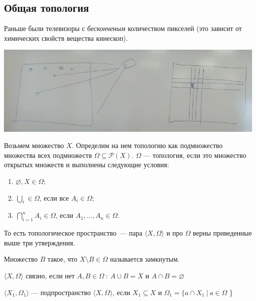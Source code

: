 \subsection{Общая топология}

Раньше были телевизоры с \textit{бесконченым} количеством пикселей (это зависит от химических свойств вещества кинескоп).

\begin{center}
    \includegraphics[scale=0.8]{img/topology_tv_example}
\end{center}

Возьмем множество $X$. Определим на нем топологию как подмножество множества всех подмножеств
$\Omega \subseteq \mathcal{P}(X)$. $\Omega$ --- топология, если это множество открытых множеств и выполнены следующие условия:
\begin{enumerate}
    \item $\varnothing, X \in \Omega$;
    \item $\bigcup\limits_i \in \Omega$, если все $A_i \in \Omega$;
    \item $\bigcap\limits_{i = 1} ^ n A_i \in \Omega$, если $A_1, \dots, A_n \in \Omega$.
\end{enumerate}

То есть топологическое пространство~--- пара $\langle X, \Omega \rangle$ и про $\Omega$ верны приведенные выше три утверждения.

\begin{definition}
 Множество $B$ такое, что $X \setminus B \in \Omega$ называется замкнутым.
\end{definition}

\begin{definition}
     $\langle X, \Omega \rangle$ связно, если нет $A, B \in \Omega ~:~ A \cup B = X$ и $A \cap B = \varnothing$
\end{definition}

\begin{definition}[Подпространство]
    $\langle X_1, \Omega_1 \rangle $ --- подпространство $\langle X, \Omega \rangle$, если
    $X_1 \subseteq X$ и $\Omega_1 = \{ a \cap X_1 ~|~ a \in \Omega$ \}
\end{definition}

